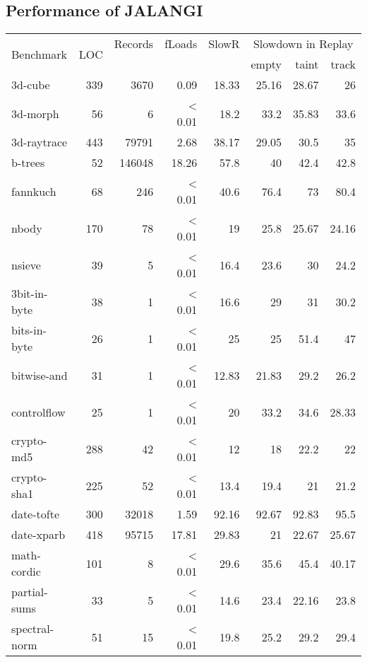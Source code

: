 \documentclass{sig-alternate}
\begin{document}
\subsection{Performance of  JALANGI}
\label{sec:performance-jalangi}

\begin{table*}
\begin{minipage}{0.6\textwidth}
{\scriptsize
\begin{center}
\begin{tabular}{|l|r|r|r|r|r|r|r|} \hline
\multirow{2}{*}{Benchmark} & \multirow{2}{*}{LOC} & \scriptsize{Records} & \scriptsize{fLoads}& \scriptsize{SlowR} &
\multicolumn{3}{|c|}{\scriptsize{ Slowdown in Replay}}\\
& & & & & empty & taint & track \\
\hline
3d-cube & 339 & 3670 & 0.09 & 18.33  & 25.16 & 28.67 & 26 \\
3d-morph& 56 & 6 & < 0.01 & 18.2 & 33.2 & 35.83 & 33.6 \\
3d-raytrace& 443 & 79791 & 2.68 & 38.17 & 29.05 & 30.5 & 35\\
b-trees& 52 & 146048 & 18.26 & 57.8 & 40 & 42.4 & 42.8\\
fannkuch& 68 & 246 & < 0.01 & 40.6 & 76.4 & 73 & 80.4 \\
nbody& 170 & 78 & < 0.01 & 19 & 25.8& 25.67 & 24.16\\
nsieve& 39 & 5 & < 0.01 & 16.4 & 23.6 & 30 & 24.2\\
3bit-in-byte& 38 & 1 & < 0.01& 16.6& 29 & 31 & 30.2 \\
bits-in-byte& 26 & 1 & < 0.01& 25 & 25 & 51.4 & 47 \\
bitwise-and& 31 & 1 & < 0.01& 12.83 & 21.83 & 29.2 & 26.2\\
controlflow& 25 & 1 & < 0.01& 20 & 33.2 & 34.6 & 28.33\\
crypto-md5& 288 & 42 & < 0.01& 12 & 18 & 22.2 & 22\\
crypto-sha1& 225 & 52 & < 0.01& 13.4& 19.4 & 21 & 21.2\\
date-tofte& 300 & 32018 & 1.59 & 92.16 & 92.67 & 92.83 & 95.5\\
date-xparb& 418 & 95715 & 17.81 & 29.83 & 21 & 22.67 & 25.67\\
math-cordic& 101 & 8 & < 0.01 & 29.6 & 35.6 & 45.4 & 40.17\\
partial-sums& 33 & 5 & < 0.01& 14.6 & 23.4 & 22.16& 23.8\\
spectral-norm& 51 & 15 & < 0.01& 19.8& 25.2 & 29.2 & 29.4\\

\end{tabular}
\end{center}}
\end{minipage}
\end{table*}
\end{document}
